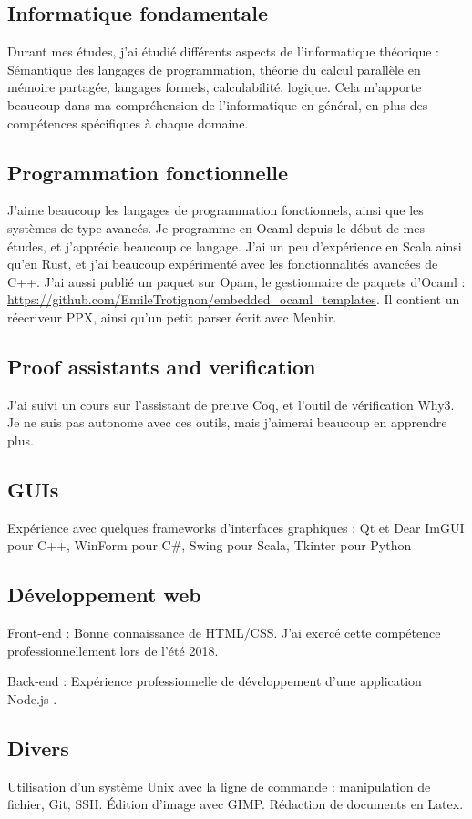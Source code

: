 \documentclass[10pt, a4paper, roman, french]{moderncv}
\begin{document}
		\subsection{Informatique fondamentale}
			Durant mes études, j'ai étudié différents aspects de l'informatique théorique :
Sémantique des langages de programmation, théorie du calcul parallèle en mémoire partagée, langages formels, calculabilité, logique.
Cela m'apporte beaucoup dans ma compréhension de l'informatique en général, en plus des compétences spécifiques à chaque domaine.
	
		\subsection{Programmation fonctionnelle}
			J'aime beaucoup les langages de programmation fonctionnels, ainsi que les systèmes de type avancés. Je programme en Ocaml depuis le début de mes études, et j'apprécie beaucoup ce langage. J'ai un peu d'expérience en Scala ainsi qu'en Rust, et j'ai beaucoup expérimenté avec les fonctionnalités avancées de C++.
J'ai aussi publié un paquet sur Opam, le gestionnaire de paquets d'Ocaml : \url{https://github.com/EmileTrotignon/embedded_ocaml_templates}.
Il contient un réecriveur PPX, ainsi qu'un petit parser écrit avec Menhir.
	
		\subsection{Proof assistants and verification}
			J'ai suivi un cours sur l'assistant de preuve Coq, et l'outil de vérification Why3. Je ne suis pas autonome avec ces outils, mais j'aimerai beaucoup en apprendre plus.
	
		\subsection{GUIs}
			Expérience avec quelques frameworks d'interfaces graphiques :
Qt et Dear ImGUI pour C++, WinForm pour C\#, Swing pour Scala, Tkinter pour Python
	
		\subsection{Développement web}
			Front-end : Bonne connaissance de HTML/CSS. J'ai exercé cette compétence professionnellement lors de l'été 2018.

Back-end : Expérience professionnelle de développement d'une application Node.js .
	
		\subsection{Divers}
			Utilisation d'un système Unix avec la ligne de commande : manipulation de fichier, Git, SSH.
Édition d'image avec GIMP.
Rédaction de documents en Latex. 
	
\end{document}
